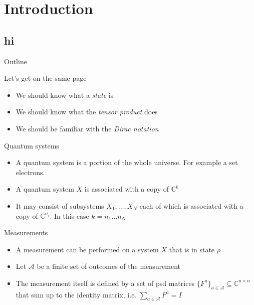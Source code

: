 \section{Introduction}
\subsection{hi}
\begin{frame}{Outline}
\tableofcontents[currentsection]
\end{frame}


\begin{frame}{Let's get on the same page}
 \begin{itemize}
  \item \large{We should know what a \textit{state} is}
  \item \large{We should know what the \textit{tensor product} does}
  \item \large{We should be familiar with the \textit{Dirac notation}}
 \end{itemize}
\end{frame}

\begin{frame}{Quantum systems}
\begin{itemize}
\item A quantum system is a portion of the whole universe. For example a set electrons. 
\item A quantum system $X$ is associated with a copy of $\mathbb{C}^k$ 
\item It may consist of subsystems $X_1, \dots , X_N$ each of which is associated with a copy of $\mathbb{C}^{n_i}$. In this case $k = n_1 \dots n_N$
\end{itemize}
\end{frame}

\begin{frame}{Measurements}
\begin{itemize}
    \item A measurement can be performed on a system $X$ that is in state $\rho$
    \item Let $\mathcal{A}$ be a finite set of outcomes of the measurement
    \item The measurement itself is defined by a set of psd matrices $\{ F^a \}_{a\in \mathcal{A}} \subseteq \mathbb{C}^{n \times n}$ that sum up to the identity matrix, i.e. $\sum_{a \in \mathcal{A}} F^a = I$
\end{itemize}
\end{frame}

